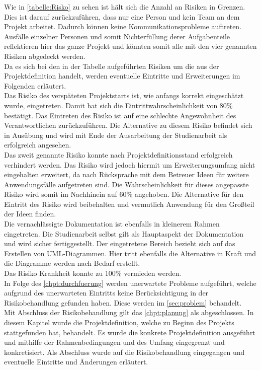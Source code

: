 Wie in \autoref{tabelle:Risko} zu sehen ist hält sich die Anzahl an Risiken in Grenzen. Dies ist darauf zurückzuführen, dass nur eine Person und kein Team an dem Projekt arbeitet. Dadurch können \zB keine Kommunikationsprobleme auftreten. Ausfälle einzelner Personen und somit Nichterfüllung derer Aufgabenteile reflektieren hier das ganze Projekt und könnten somit alle mit den vier genannten Risiken abgedeckt werden.\\
Da es sich bei den in der Tabelle aufgeführten Risiken um die aus der Projektdefinition handelt, werden eventuelle Eintritte und Erweiterungen im Folgenden erläutert.\\
Das Risiko des verspäteten Projektstarts ist, wie anfangs korrekt eingeschätzt wurde, eingetreten. Damit hat sich die Eintrittwahrscheinlichkeit von 80\% bestätigt. Das Eintreten des Risiko ist auf eine schlechte Angewohnheit des Verantwortlichen zurückzuführen. Die Alternative zu diesem Risiko befindet sich in Ausübung und wird mit Ende der Ausarbeitung der Studienarbeit als erfolgreich angesehen.\\
Das zweit genannte Risiko konnte nach Projektdefinitionsstand erfolgreich verhindert werden. Das Risiko wird jedoch hiermit um \glqq Erweiterungsumfang nicht eingehalten\grqq{} erweitert, da nach Rücksprache mit dem Betreuer Ideen für weitere Anwendungsfälle aufgetreten sind. Die Wahrscheinlichkeit für dieses angepasste Risiko wird somit im Nachhinein auf 60\% angehoben. Die Alternative für den Eintritt des Risiko wird beibehalten und vermutlich Anwendung für den Großteil der Ideen finden.\\
Die vernachlässigte Dokumentation ist ebenfalls in kleinerem Rahmen eingetreten. Die Studienarbeit selbst gilt als Hauptaspekt der Dokumentation und wird sicher fertiggestellt. Der eingetretene Bereich bezieht sich auf das Erstellen von \ac{UML}-Diagrammen. Hier tritt ebenfalls die Alternative in Kraft und die Diagramme werden nach Bedarf erstellt.\\
Das Risiko Krankheit konnte zu 100\% vermieden werden.\\
In Folge des \autoref{chpt:durchfuerung}  werden unerwartete Probleme aufgeführt, welche aufgrund des unerwarteten Eintritts keine Berücksichtigung in der Risikobehandlung gefunden haben. Diese werden im \autoref{sec:problem}  behandelt.\\

Mit Abschluss der Risikobehandlung gilt das \autoref{chpt:planung}  als abgeschlossen. In diesem Kapitel wurde die Projektdefinition, welche zu Beginn des Projekts stattgefunden hat, behandelt. Es wurde die konkrete Projektdefinition ausgeführt und mithilfe der Rahmenbedingungen und des Umfang eingegrenzt und konkretisiert. Als Abschluss wurde auf die Risikobehandlung eingegangen und eventuelle Eintritte und Änderungen erläutert.